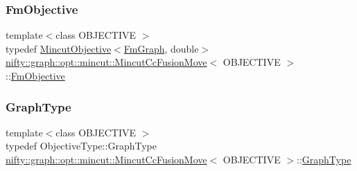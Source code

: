 \mbox{\label{classnifty_1_1graph_1_1opt_1_1mincut_1_1MincutCcFusionMove_a5f30047aa697335e354346a6c1c2f8ad}} 
\subsubsection{\texorpdfstring{Fm\+Objective}{FmObjective}}
{\footnotesize\ttfamily template$<$class O\+B\+J\+E\+C\+T\+I\+VE $>$ \\
typedef \hyperlink{classnifty_1_1graph_1_1opt_1_1mincut_1_1MincutObjective}{Mincut\+Objective}$<$\hyperlink{classnifty_1_1graph_1_1opt_1_1mincut_1_1MincutCcFusionMove_a5ae3c9a6e16601c6de022f74b7600a2d}{Fm\+Graph}, double$>$ \hyperlink{classnifty_1_1graph_1_1opt_1_1mincut_1_1MincutCcFusionMove}{nifty\+::graph\+::opt\+::mincut\+::\+Mincut\+Cc\+Fusion\+Move}$<$ O\+B\+J\+E\+C\+T\+I\+VE $>$\+::\hyperlink{classnifty_1_1graph_1_1opt_1_1mincut_1_1MincutCcFusionMove_a5f30047aa697335e354346a6c1c2f8ad}{Fm\+Objective}}

\mbox{\label{classnifty_1_1graph_1_1opt_1_1mincut_1_1MincutCcFusionMove_aac01d4c3a458b6c5b324e23d256e3e9f}} 
\subsubsection{\texorpdfstring{Graph\+Type}{GraphType}}
{\footnotesize\ttfamily template$<$class O\+B\+J\+E\+C\+T\+I\+VE $>$ \\
typedef Objective\+Type\+::\+Graph\+Type \hyperlink{classnifty_1_1graph_1_1opt_1_1mincut_1_1MincutCcFusionMove}{nifty\+::graph\+::opt\+::mincut\+::\+Mincut\+Cc\+Fusion\+Move}$<$ O\+B\+J\+E\+C\+T\+I\+VE $>$\+::\hyperlink{classnifty_1_1graph_1_1opt_1_1mincut_1_1MincutCcFusionMove_aac01d4c3a458b6c5b324e23d256e3e9f}{Graph\+Type}}

